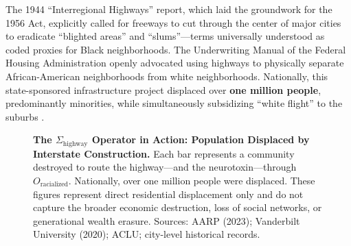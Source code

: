 The 1944 ``Interregional Highways'' report, which laid the groundwork for the 1956 Act, explicitly called for freeways to cut through the center of major cities to eradicate ``blighted areas'' and ``slums''---terms universally understood as coded proxies for Black neighborhoods. The Underwriting Manual of the Federal Housing Administration openly advocated using highways to physically separate African-American neighborhoods from white neighborhoods. Nationally, this state-sponsored infrastructure project displaced over \textbf{one million people}, predominantly minorities, while simultaneously subsidizing ``white flight'' to the suburbs \cite{tel_displacement}.

\begin{figure}[htbp]
\centering
{}
\caption{\textbf{The $\Sigma_{\text{highway}}$ Operator in Action: Population Displaced by Interstate Construction.} Each bar represents a community destroyed to route the highway---and the neurotoxin---through $O_{\text{racialized}}$. Nationally, over one million people were displaced. These figures represent direct residential displacement only and do not capture the broader economic destruction, loss of social networks, or generational wealth erasure. Sources: AARP (2023); Vanderbilt University (2020); ACLU; city-level historical records.}
\label{fig:highway_displacement}
\end{figure}

